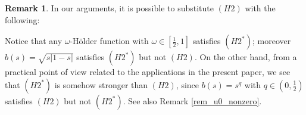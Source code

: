 \documentclass[11pt, reqno]{amsart}
\theoremstyle{definition}
\newtheorem{remark}[lemma]{Remark}
\numberwithin{equation}{section}
\def\abs#1{|#1|}
\begin{document}
\begin{remark}
	In our arguments, it is possible to substitute \hyperlink{H2}{\( (H2) \)} with the following: 
Notice that any $\omega$-Hölder function with $\omega \in [\frac{1}{2},1]$ satisfies \hyperlink{H2*}{\( (H2^*) \)}; moreover $b(s)=\sqrt{s \abs{1-s}}$ satisfies \hyperlink{H2*}{\( (H2^*) \)} but not \hyperlink{H2}{\( (H2) \)}.
On the other hand, from a practical point of view related to the applications in the present paper, we see that \hyperlink{H2*}{\( (H2^*) \)} is somehow stronger than \hyperlink{H2}{\( (H2) \)}, since $b(s)=s^q$ with $q\in (0,\frac{1}{2})$ satisfies \hyperlink{H2}{\( (H2) \)} but not \hyperlink{H2*}{\( (H2^*) \)}. 
See also Remark \ref{rem_u0_nonzero}.
\end{remark}
\end{document}
